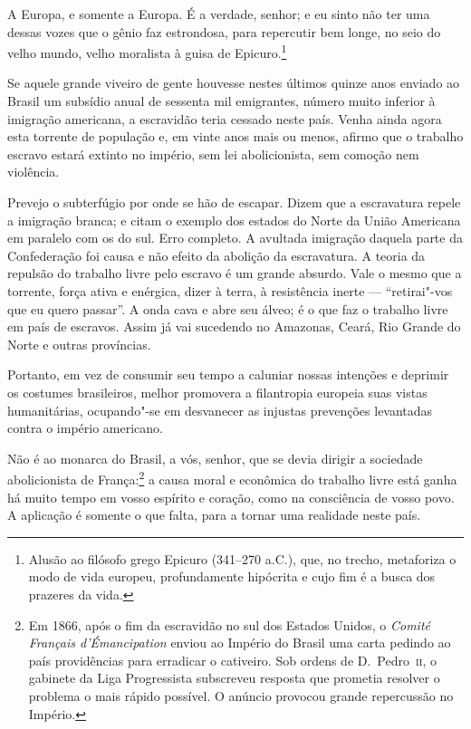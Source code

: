  A Europa, e somente a Europa. É a verdade, senhor; e eu sinto não ter
uma dessas vozes que o gênio faz estrondosa, para repercutir bem longe,
no seio do velho mundo, velho moralista à guisa de
Epicuro.\footnote{ Alusão ao filósofo grego Epicuro (341--270 a.C.), que, no trecho, metaforiza
o modo de vida europeu, profundamente hipócrita e cujo fim é a busca dos prazeres da vida.} 

 Se aquele grande viveiro de gente houvesse nestes últimos quinze anos
enviado ao Brasil um subsídio anual de sessenta mil emigrantes, número
muito inferior à imigração americana, a escravidão teria cessado neste
país. Venha ainda agora esta torrente de população e, em vinte anos
mais ou menos, afirmo que o trabalho escravo estará extinto no império,
sem lei abolicionista, sem comoção nem violência.

 Prevejo o subterfúgio por onde se hão de escapar. Dizem que a
escravatura repele a imigração branca; e citam o exemplo dos estados do
Norte da União Americana em paralelo com os do sul. Erro completo. A
avultada imigração daquela parte da Confederação foi causa e não efeito
da abolição da escravatura. A teoria da repulsão do trabalho livre pelo
escravo é um grande absurdo. Vale o mesmo que a torrente, força ativa e
enérgica, dizer à terra, à resistência inerte --- ``retirai"-vos que eu
quero passar''. A onda cava e abre seu álveo; é o que faz o trabalho
livre em país de escravos. Assim já vai sucedendo no Amazonas, Ceará,
Rio Grande do Norte e outras províncias. 

 Portanto, em vez de consumir seu tempo a caluniar nossas intenções e
deprimir os costumes brasileiros, melhor promovera a filantropia
europeia suas vistas humanitárias, ocupando"-se em desvanecer as
injustas prevenções levantadas contra o império americano. 

Não é ao monarca do Brasil, a vós, senhor, que se devia dirigir a
sociedade abolicionista de França:\footnote{ Em 1866, após o fim da escravidão no sul dos 
Estados Unidos, o \textit{Comité Français d'Émancipation} enviou ao Império do Brasil uma 
carta pedindo ao país providências para erradicar o cativeiro. Sob ordens de D.~Pedro~\textsc{ii}, 
o gabinete da Liga Progressista subscreveu resposta que prometia resolver o problema o mais rápido 
possível. O anúncio provocou grande repercussão no Império.} 
a causa moral e econômica do trabalho livre está ganha há muito tempo
em vosso espírito e coração, como na consciência de vosso povo. A
aplicação é somente o que falta, para a tornar uma realidade neste país.

